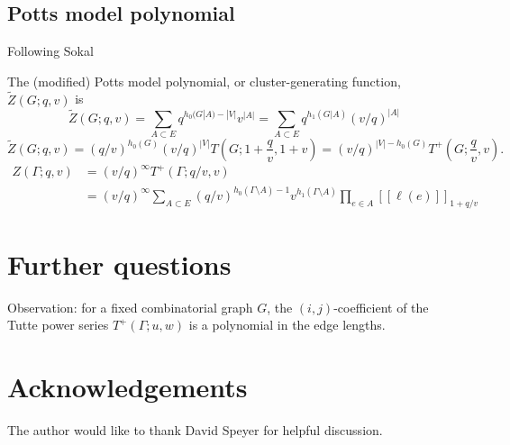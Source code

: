 \documentclass{amsart}
\theoremstyle{definition}
\newcommand{\fanalog}[2]{[\![#2]\!]_{#1}}
\begin{document}
\subsection{Potts model polynomial}

Following Sokal~\cite[Section 2.5]{Sok-potts}

The (modified) Potts model polynomial, or cluster-generating function, $\widetilde Z(G; q,v)$ is
\[
	\widetilde Z(G; q, v) = \sum_{A \subset E} q^{h_0(G|A) - |V|} v^{|A|}
	= \sum_{A \subset E} q^{h_1(G|A)} (v/q)^{|A|}
\]
\[
	\widetilde Z(G; q,v) = (q/v)^{h_0(G)} (v/q)^{|V|} T(G; 1 + \frac{q}{v}, 1 + v) 
	= (v/q)^{|V| - h_0(G)} T^+(G; \frac{q}{v}, v) .
\]
\begin{align*}
	Z(\Gamma; q, v) &= (v/q)^{\infty} T^+(\Gamma; q/v, v) \\
	&= (v/q)^{\infty} \sum_{A \subset E} (q/v)^{h_0(\Gamma \setminus A) - 1} v^{h_1(\Gamma \setminus A)} \prod_{e \in A} \fanalog{1 + q/v}{\ell(e)}
\end{align*}

\section{Further questions}

Observation: for a fixed combinatorial graph $G$, the $(i,j)$-coefficient of the Tutte power series $T^+(\Gamma; u,w)$ is a polynomial in the edge lengths.

\section*{Acknowledgements}
The author would like to thank David Speyer for helpful discussion.


 

\end{document}
